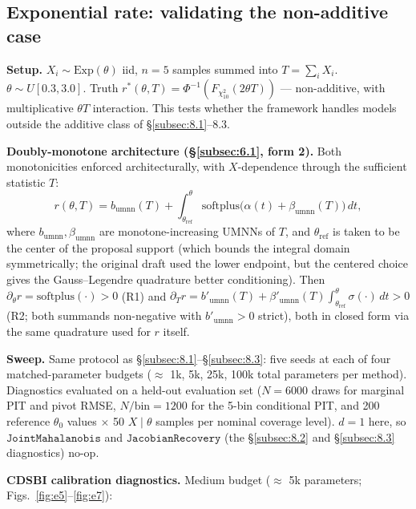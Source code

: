 \documentclass[11pt]{article}
\begin{document}
\subsection{Exponential rate: validating the non-additive case}\label{subsec:8.4}

\textbf{Setup.} \(X_i \sim \mathrm{Exp}(\theta)\) iid, \(n = 5\) samples
summed into \(T = \sum_i X_i\). \(\theta \sim U[0.3, 3.0]\). Truth
\(r^*(\theta, T) = \Phi^{-1}(F_{\chi^2_{10}}(2\theta T))\) ---
non-additive, with multiplicative \(\theta T\) interaction. This tests
whether the framework handles models outside the additive class of
\S\ref{subsec:8.1}--8.3.

\textbf{Doubly-monotone architecture (\S\ref{subsec:6.1}, form 2).} Both
monotonicities enforced architecturally, with \(X\)-dependence through
the sufficient statistic \(T\): \[
r(\theta, T) = b_\mathrm{umnn}(T) + \int_{\theta_\mathrm{ref}}^{\theta} \mathrm{softplus}\bigl(\alpha(t) + \beta_\mathrm{umnn}(T)\bigr)\, dt,
\] where \(b_\mathrm{umnn}, \beta_\mathrm{umnn}\) are
monotone-increasing UMNNs of \(T\), and \(\theta_\mathrm{ref}\) is taken
to be the center of the proposal support (which bounds the integral
domain symmetrically; the original draft used the lower endpoint, but
the centered choice gives the Gauss--Legendre quadrature better
conditioning). Then \(\partial_\theta r = \mathrm{softplus}(\cdot) > 0\)
(R1) and
\(\partial_T r = b'_\mathrm{umnn}(T) + \beta'_\mathrm{umnn}(T) \int_{\theta_\mathrm{ref}}^\theta \sigma(\cdot)\, dt > 0\)
(R2; both summands non-negative with \(b'_\mathrm{umnn} > 0\) strict),
both in closed form via the same quadrature used for \(r\) itself.

\textbf{Sweep.} Same protocol as
\S\ref{subsec:8.1}--\S\ref{subsec:8.3}: five seeds at each of four
matched-parameter budgets (\(\approx\) 1k, 5k, 25k, 100k total
parameters per method). Diagnostics evaluated on a held-out evaluation
set (\(N = 6000\) draws for marginal PIT and pivot RMSE,
\(N/\text{bin} = 1200\) for the 5-bin conditional PIT, and 200 reference
\(\theta_0\) values \(\times\) 50 \(X \mid \theta\) samples per nominal
coverage level). \(d = 1\) here, so \(\mathtt{JointMahalanobis}\) and
\(\mathtt{JacobianRecovery}\) (the \S\ref{subsec:8.2} and \S\ref{subsec:8.3}
diagnostics) no-op.

\textbf{CDSBI calibration diagnostics.} Medium budget
(\(\approx\) 5k parameters; Figs.~\ref{fig:e5}--\ref{fig:e7}):
\end{document}
